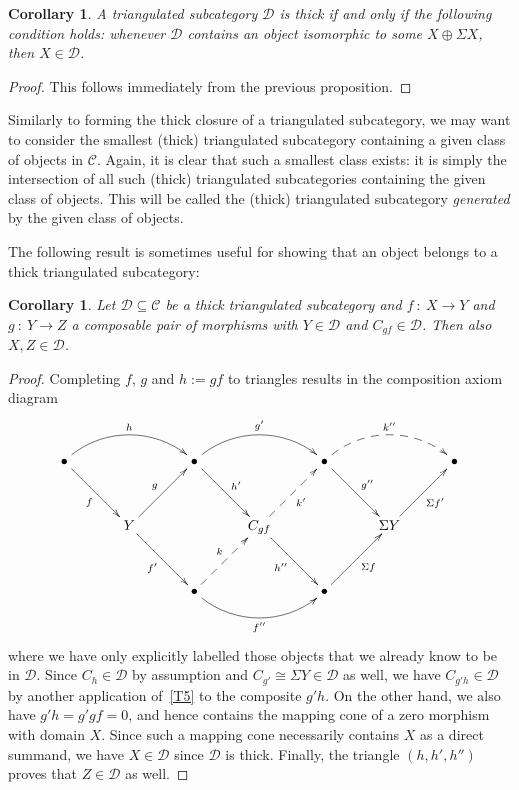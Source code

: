 \documentclass{amsproc}
\newtheorem{cor}[prop]{Corollary}
\theoremstyle{definition}
\begin{document}
\begin{cor}
\label{thickness}
A triangulated subcategory ${\mathcal{D}}$ is thick if and only if the following condition holds: whenever ${\mathcal{D}}$ contains an object isomorphic to some $X\oplus \Sigma X$, then $X\in{\mathcal{D}}$.
\end{cor}

\begin{proof}
This follows immediately from the previous proposition.
\end{proof}

Similarly to forming the thick closure of a triangulated subcategory, we may want to consider the smallest (thick) triangulated subcategory containing a given class of objects in ${\mathcal{C}}$. Again, it is clear that such a smallest class exists: it is simply the intersection of all such (thick) triangulated subcategories containing the given class of objects. This will be called the (thick) triangulated subcategory \emph{generated} by the given class of objects.

The following result is sometimes useful for showing that an object belongs to a thick triangulated subcategory:

\begin{cor}
\label{thickcrit}
Let ${\mathcal{D}}\subseteq{\mathcal{C}}$ be a thick triangulated subcategory and $f\: :\: X{\longrightarrow} Y$ and $g\: :\: Y{\longrightarrow} Z$ a composable pair of morphisms with $Y\in{\mathcal{D}}$ and $C_{gf}\in{\mathcal{D}}$. Then also $X,Z\in{\mathcal{D}}$.
\end{cor}

\begin{proof}
Completing $f$, $g$ and $h:=gf$ to triangles results in the composition axiom diagram
\[
\xymatrix@!{{\bullet}\ar@(ru,lu)[rr]^h\ar[rd]_f & & {\bullet}\ar@(ru,lu)[rr]^{g'}\ar[rd]^{h'} & & {\bullet}\ar@(ru,lu)@{-->}[rr]^{k''}\ar[rd]^{g''} & & {\bullet}\\
& Y \ar[ur]^g\ar[rd]_{f'} & & C_{gf} \ar@{-->}[ru]_{k'}\ar[rd]_{h''} & & \Sigma Y \ar[ru]_{\Sigma f'} &\\
& & {\bullet}\ar@(rd,ld)[rr]_{f''}\ar@{-->}[ru]^{k} & & {\bullet}\ar[ru]_{\Sigma f} & &}
\]
where we have only explicitly labelled those objects that we already know to be in ${\mathcal{D}}$. Since $C_h\in{\mathcal{D}}$ by assumption and $C_{g'}\cong\Sigma Y\in{\mathcal{D}}$ as well, we have $C_{g'h}\in{\mathcal{D}}$ by another application of~\ref{T5} to the composite $g'h$. On the other hand, we also have $g'h=g'gf=0$, and hence contains the mapping cone of a zero morphism with domain $X$. Since such a mapping cone necessarily contains $X$ as a direct summand, we have $X\in{\mathcal{D}}$ since ${\mathcal{D}}$ is thick. Finally, the triangle $(h,h',h'')$ proves that $Z\in{\mathcal{D}}$ as well.
\end{proof}
\end{document}
